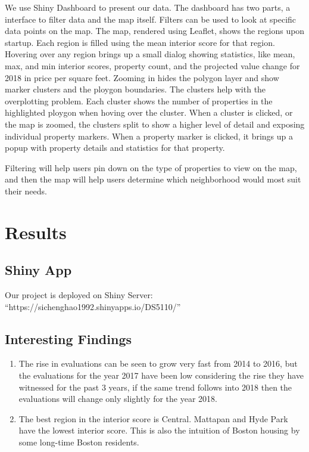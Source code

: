 \documentclass[12pt]{article}
\begin{document}
We use Shiny Dashboard \cite{ShinyDas50:online} to present our data. The 
dashboard has two parts, a interface to filter data and the map itself. 
Filters can be used to look at specific data points on the map. The map,
rendered using Leaflet, shows the regions upon startup. Each region is
filled using the mean interior score for that region. Hovering over any
region brings up a small dialog showing statistics, like mean, max, and
min interior scores, property count, and the projected value change for
2018 in price per square feet. Zooming in hides the polygon layer and
show marker clusters and the ploygon boundaries. The clusters help with
the overplotting problem. Each cluster shows the number of properties in
the highlighted ploygon when hoving over the cluster. When a cluster is
clicked, or the map is zoomed, the clusters split to show a higher level
of detail and exposing individual property markers. When a property
marker is clicked, it brings up a popup with property details and
statistics for that property.

Filtering will help users pin down on the type of properties to view on
the map, and then the map will help users determine which neighborhood
would most suit their needs.

\section*{Results}

\subsection{Shiny App}

Our project is deployed on Shiny Server:
``https://sichenghao1992.shinyapps.io/DS5110/''


\subsection{Interesting Findings}
    \begin{enumerate}
        \item The rise in evaluations can be seen to grow very fast from 
            2014 to 2016, but the evaluations for the year 2017 have been 
            low considering the rise they have witnessed for the past 3 
            years, if the same trend follows into 2018 then the 
            evaluations will change only slightly for the year 2018.
        \item The best region in the interior score is Central. Mattapan 
          and Hyde Park have the lowest interior score. This is also the 
          intuition of Boston housing by some long-time Boston residents. 
    \end{enumerate}
\end{document}
